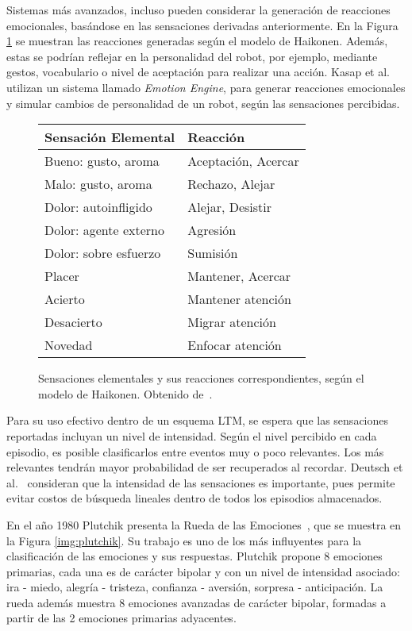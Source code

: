 Sistemas más avanzados, incluso pueden considerar la generación de reacciones emocionales, basándose en las sensaciones derivadas anteriormente. En la Figura \ref{img:emotional_haikonen} se muestran las reacciones generadas según el modelo de Haikonen. Además, estas se podrían reflejar en la personalidad del robot, por ejemplo, mediante gestos, vocabulario o nivel de aceptación para realizar una acción. Kasap et al.~\cite{Kasap2010} utilizan un sistema llamado \textit{Emotion Engine}, para generar reacciones emocionales y simular cambios de personalidad de un robot, según las sensaciones percibidas.

\begin{figure}[!ht]
	\centering
	\begin{tabular}{| l | l |}
		\hline
		\rowcolor{gray!50}
		Sensación Elemental & Reacción  \\ 
		\hline Bueno: gusto, aroma & Aceptación, Acercar \\ 
		\hline Malo: gusto, aroma & Rechazo, Alejar \\ 
		\hline Dolor: autoinfligido  & Alejar, Desistir \\ 
		\hline Dolor: agente externo & Agresión \\ 
		\hline Dolor: sobre esfuerzo & Sumisión \\ 
		\hline Placer & Mantener, Acercar \\ 
		\hline Acierto & Mantener atención \\ 
		\hline Desacierto & Migrar atención \\ 
		\hline Novedad & Enfocar atención \\ 
		\hline 
	\end{tabular} 
	\caption{\small Sensaciones elementales y sus reacciones correspondientes, según el modelo de Haikonen. Obtenido de~\cite{Dodd2005}.}
	\label{img:emotional_haikonen}
\end{figure}

Para su uso efectivo dentro de un esquema LTM, se espera que las sensaciones reportadas incluyan un nivel de intensidad. Según el nivel percibido en cada episodio, es posible clasificarlos entre eventos muy o poco relevantes. Los más relevantes tendrán mayor probabilidad de ser recuperados al recordar. Deutsch et al.~\cite{Deutsch2008} consideran que la intensidad de las sensaciones es importante, pues permite evitar costos de búsqueda lineales dentro de todos los episodios almacenados.

En el año 1980 Plutchik presenta la Rueda de las Emociones~\cite{plutchik1980}, que se muestra en la Figura \ref{img:plutchik}. Su trabajo es uno de los más influyentes para la clasificación de las emociones y sus respuestas. Plutchik propone 8 emociones primarias, cada una es de carácter bipolar y con un nivel de intensidad asociado: ira - miedo, alegría - tristeza, confianza - aversión, sorpresa - anticipación. La rueda además muestra 8 emociones avanzadas de carácter bipolar, formadas a partir de las 2 emociones primarias adyacentes.

